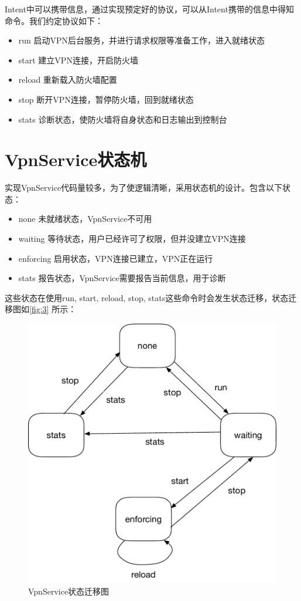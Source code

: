\documentclass[format=final, language=chinese, degree=fyp]{hustthesis}
\begin{document}
Intent中可以携带信息，通过实现预定好的协议，可以从Intent携带的信息中得知命令。我们约定协议如下：
\begin{itemize}
    \item run     启动VPN后台服务，并进行请求权限等准备工作，进入就绪状态
    \item start   建立VPN连接，开启防火墙
    \item reload  重新载入防火墙配置
    \item stop    断开VPN连接，暂停防火墙，回到就绪状态
    \item stats   诊断状态，使防火墙将自身状态和日志输出到控制台
\end{itemize}

\section{VpnService状态机}

实现VpnService代码量较多，为了使逻辑清晰，采用状态机的设计。包含以下状态：
\begin{itemize}
    \item none          未就绪状态，VpnService不可用
    \item waiting       等待状态，用户已经许可了权限，但并没建立VPN连接
    \item enforcing     启用状态，VPN连接已建立，VPN正在运行
    \item stats         报告状态，VpnService需要报告当前信息，用于诊断
\end{itemize}

这些状态在使用run, start, reload, stop, stats这些命令时会发生状态迁移，状态迁移图如\autoref{fig:3} 所示：

\begin{figure}[h!]
\centering
\includegraphics[width=.6\textwidth]{state_machine}
\caption{VpnService状态迁移图}\label{fig:3}
\end{figure}
\end{document}
